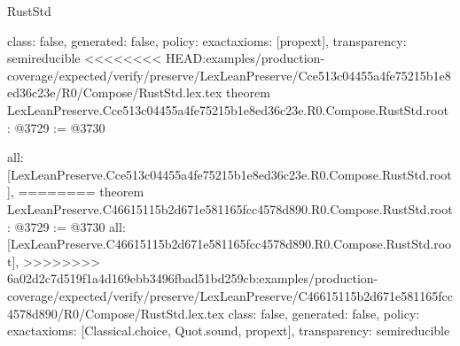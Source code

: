 \begin{lexlean}{RustStd}
\begin{coremodule}
{\begin{coremodule}
{{{{{{{  class: false,
  generated: false,
  policy: exact{axioms: [propext]},
  transparency: semireducible
}
<<<<<<<< HEAD:examples/production-coverage/expected/verify/preserve/LexLeanPreserve/Cce513c04455a4fe75215b1e8ed36c23e/R0/Compose/RustStd.lex.tex
theorem LexLeanPreserve.Cce513c04455a4fe75215b1e8ed36c23e.R0.Compose.RustStd.root : @3729 := @3730 {
  all: [LexLeanPreserve.Cce513c04455a4fe75215b1e8ed36c23e.R0.Compose.RustStd.root],
========
theorem LexLeanPreserve.C46615115b2d671e581165fcc4578d890.R0.Compose.RustStd.root : @3729 := @3730 {
  all: [LexLeanPreserve.C46615115b2d671e581165fcc4578d890.R0.Compose.RustStd.root],
>>>>>>>> 6a02d2c7d519f1a4d169ebb3496fbad51bd259cb:examples/production-coverage/expected/verify/preserve/LexLeanPreserve/C46615115b2d671e581165fcc4578d890/R0/Compose/RustStd.lex.tex
  class: false,
  generated: false,
  policy: exact{axioms: [Classical.choice, Quot.sound, propext]},
  transparency: semireducible
}

}}}}}}}
\end{coremodule}}
\end{coremodule}
\end{lexlean}
